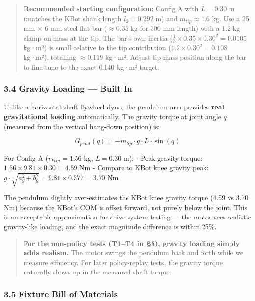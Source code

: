 \documentclass[
]{article}
\begin{document}
\begin{quote}
\textbf{Recommended starting configuration:} Config A with \(L = 0.30\)
m (matches the KBot shank length \(l_2 = 0.292\) m) and
\(m_{tip} \approx 1.6\) kg. Use a 25 mm × 6 mm steel flat bar
(\(\approx 0.35\) kg for 300 mm length) with a 1.2 kg clamp-on mass at
the tip. The bar's own inertia
(\(\frac{1}{3} \times 0.35 \times 0.30^2 = 0.0105\) kg·m²) is small
relative to the tip contribution (\(1.2 \times 0.30^2 = 0.108\) kg·m²),
totalling \(\approx 0.119\) kg·m². Adjust tip mass position along the
bar to fine-tune to the exact 0.140 kg·m² target.
\end{quote}

\subsubsection{3.4 Gravity Loading --- Built
In}\label{gravity-loading-built-in}

Unlike a horizontal-shaft flywheel dyno, the pendulum arm provides
\textbf{real gravitational loading} automatically. The gravity torque at
joint angle \(q\) (measured from the vertical hang-down position) is:

\[
G_{pend}(q) = -m_{tip} \cdot g \cdot L \cdot \sin(q)
\]

For Config A (\(m_{tip} = 1.56\) kg, \(L = 0.30\) m): - Peak gravity
torque: \(1.56 \times 9.81 \times 0.30 = 4.59\) Nm - Compare to KBot
knee gravity peak:
\(g \cdot \sqrt{a_g^2 + b_g^2} = 9.81 \times 0.377 = 3.70\) Nm

The pendulum slightly over-estimates the KBot knee gravity torque (4.59
vs 3.70 Nm) because the KBot's COM is offset forward, not purely below
the joint. This is an acceptable approximation for drive-system testing
--- the motor sees realistic gravity-like loading, and the exact
magnitude difference is within 25\%.

\begin{quote}
\textbf{For the non-policy tests (T1--T4 in §5), gravity loading simply
adds realism.} The motor swings the pendulum back and forth while we
measure efficiency. For later policy-replay tests, the gravity torque
naturally shows up in the measured shaft torque.
\end{quote}

\subsubsection{3.5 Fixture Bill of
Materials}\label{fixture-bill-of-materials}
\end{document}
